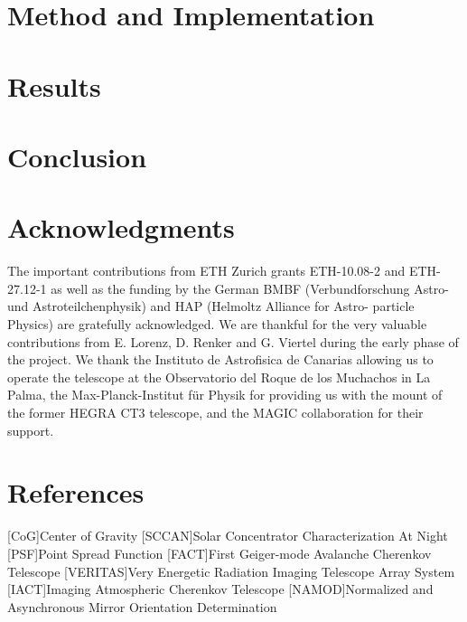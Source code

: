 \documentclass[review]{elsarticle}
\begin{document}
%
\section{Method and Implementation}
\label{SecMethod}
\section{Results}
%
\section{Conclusion}

%
\section*{Acknowledgments}
%
The important contributions from ETH Zurich grants ETH-10.08-2 and ETH-27.12-1 as well as the funding by the German BMBF (Verbundforschung Astro- und Astroteilchenphysik) and HAP (Helmoltz Alliance for Astro- particle Physics) are gratefully acknowledged. 
%
We are thankful for the very valuable contributions from E. Lorenz, D. Renker and G. Viertel during the early phase of the project. 
%
We thank the Instituto de Astrofisica de Canarias allowing us to operate the telescope at the Observatorio del Roque de los Muchachos in La Palma, the Max-Planck-Institut für Physik for providing us with the mount of the former HEGRA CT3 telescope, and the MAGIC collaboration for their support.
%
\section*{References}

%
\begin{acronym}
    [CoG]{Center of Gravity}
	[SCCAN]{Solar Concentrator Characterization At Night}
	[PSF]{Point Spread Function}
	[FACT]{First Geiger-mode Avalanche Cherenkov Telescope}
	[VERITAS]{Very Energetic Radiation Imaging Telescope Array System}
    [IACT]{Imaging Atmospheric Cherenkov Telescope}
    [NAMOD]{Normalized and Asynchronous Mirror Orientation Determination}
\end{acronym}
\end{document}
